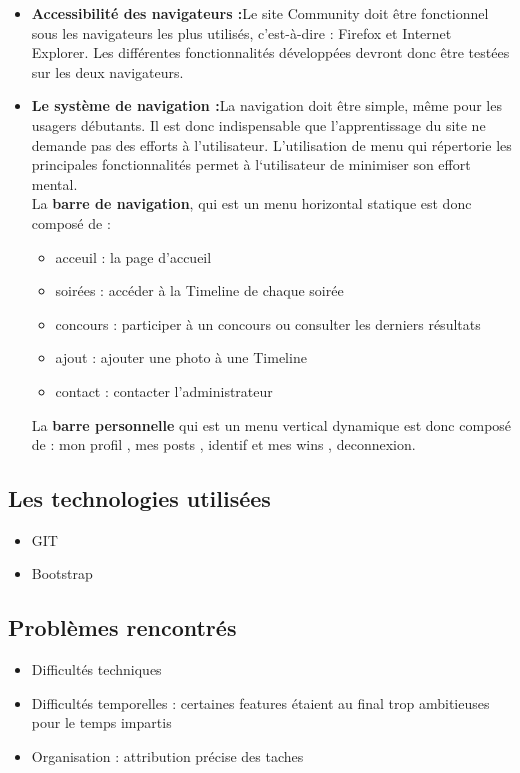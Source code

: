 \documentclass[11pt]{article} %
\begin{document}
\begin{itemize}
\item \textbf {Accessibilité des navigateurs :}Le site Community doit être fonctionnel sous les navigateurs les plus utilisés, c’est-à-dire : Firefox et Internet Explorer. Les différentes fonctionnalités développées devront donc être testées sur les deux navigateurs.

\item \textbf{Le système de navigation :}La navigation doit être simple, même pour les usagers débutants. Il est donc indispensable que l’apprentissage du site ne demande pas des efforts à l’utilisateur. L’utilisation de menu qui répertorie les principales fonctionnalités permet à l‘utilisateur de minimiser son effort mental.\\
La \textbf{barre de navigation}, qui est un menu horizontal statique est donc composé de :
	\begin{itemize}
	\item acceuil : la page d’accueil
	\item soirées : accéder à la Timeline de chaque soirée
	\item concours : participer à un concours ou consulter les derniers résultats
	\item ajout : ajouter une photo à une Timeline
	\item contact : contacter l’administrateur
	\end{itemize}
La \textbf{barre personnelle} qui est un menu vertical dynamique est donc composé de : mon profil , mes posts , identif et mes wins , deconnexion.
\end{itemize}


\subsection {Les technologies utilisées}
\begin{itemize}
\item GIT
\item Bootstrap
\end{itemize}
	
\subsection {Problèmes rencontrés}
\begin{itemize}
\item Difficultés techniques
\item Difficultés temporelles : certaines features étaient au final trop ambitieuses pour le temps impartis
\item Organisation : attribution précise des taches
\end{itemize}
\end{document}
